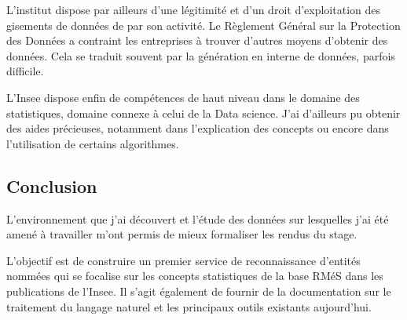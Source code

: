 L'institut dispose par ailleurs d'une légitimité et d'un droit d'exploitation des gisements de données de par son activité. Le Règlement Général sur la Protection des Données a contraint les entreprises à trouver d'autres moyens d'obtenir des données. Cela se traduit souvent par la génération en interne de données, parfois difficile.
\newline

L'Insee dispose enfin de compétences de haut niveau dans le domaine des statistiques, domaine connexe à celui de la Data science. J'ai d'ailleurs pu obtenir des aides précieuses, notamment dans l'explication des concepts ou encore dans l'utilisation de certains algorithmes.
\newline

\subsection*{Conclusion}
L'environnement que j'ai découvert et l'étude des données sur lesquelles j'ai été amené à travailler m'ont permis de mieux formaliser les rendus du stage.

L'objectif est de construire un premier service de reconnaissance d'entités nommées qui se focalise sur les concepts statistiques de la base RMéS dans les publications de l'Insee. Il s'agit également de fournir de la documentation sur le traitement du langage naturel et les principaux outils existants aujourd'hui.
